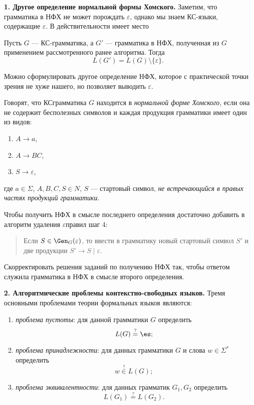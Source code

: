 \begin{center}
{\bfseries\Large \textsc{\Llabel{} \Lnum}}
\end{center}

\textbf{1. Другое определение нормальной формы Хомского.} Заметим, что
грамматика в НФХ не может порождать $\varepsilon$, однако мы знаем КС-языки,
содержащие $\varepsilon$. В действительности имеет место
\begin{Thm}
Пусть $G$ — КС-грамматика, а $G'$ — грамматика в НФХ, полученная из $G$
применением рассмотренного ранее алгоритма. Тогда
$$
    L(G') = L(G) \setminus \{\varepsilon\}.
$$
\end{Thm}

Можно сформулировать другое определение НФХ, которое с практической точки зрения
не хуже нашего, но позволяет выводить $\varepsilon$.
\begin{Def}
Говорят, что КС\nbdash грамматика $G$ находится в \emph{нормальной форме
Хомского}, если она не содержит бесполезных символов и каждая продукция грамматики имеет 
один из видов:
\begin{enumerate}
  \item $A \to a$,
  \item $A \to BC$,
  \item $S \to \varepsilon$,
\end{enumerate}
где $a \in \Sigma$, $A, B, C, S \in N$, $S$ — стартовый символ, \emph{не
встречающийся в правых частях продукций грамматики}.
\end{Def}

Чтобы получить НФХ в смысле последнего определения достаточно добавить в
алгоритм удаления $\varepsilon$\nbdash{}правил шаг 4:
\begin{quote}
Если $S \in \Gen_G(\varepsilon)$, то ввести в грамматику новый стартовый символ
$S'$ и две продукции $S' \to S \mid \varepsilon$.
\end{quote}
\HW{} Скорректировать решения заданий по получению НФХ так, чтобы ответом
служила грамматика в НФХ в смысле второго определения.

\textbf{2. Алгоритмические проблемы контекстно-свободных языков.} Тремя
основными проблемами теории формальных языков являются:
\begin{enumerate}
  \item \textit{проблема пустоты}: для данной грамматики $G$ определить $$L(G)
  \stackrel{?}{=} \es;$$
  \item \textit{проблема принадлежности}: для данных грамматики $G$ и слова $w
  \in \Sigma^*$ определить
  $$w \stackrel{?}{\in} L(G);$$
  \item \textit{проблема эквивалентности}: для данных грамматик $G_1, G_2$
  определить
  $$
    L(G_1) \stackrel{?}{=} L(G_2).
  $$
\end{enumerate}

